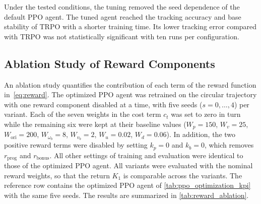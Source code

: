 \documentclass{ieeeaccess}
\begin{document}
Under the tested conditions, the tuning removed the seed dependence of the default PPO agent. The tuned
agent reached the tracking accuracy and base stability of TRPO with a shorter training time. Its lower
tracking error compared with TRPO was not statistically significant with ten runs per configuration.

\subsection{Ablation Study of Reward Components}\label{sec:reward_ablation} An ablation study quantifies
the contribution of each term of the reward function in~\eqref{eq:reward}. The
optimized PPO agent was retrained on the circular trajectory with one reward component disabled at a
time, with five seeds ($s = 0,\dots,4$) per variant. Each of the seven weights in the cost term $c_t$ was
set to zero in turn while the remaining six were kept at their baseline values ($W_p=150$, $W_v=25$,
$W_{\mathrm{ori}}=200$, $W_{\omega_b}=8$, $W_{v_b}=2$, $W_u=0.02$, $W_d=0.06$). In
addition, the two positive reward terms were disabled by setting $k_p = 0$ and $k_b = 0$, which removes
$r_{\mathrm{prog}}$ and $r_{\mathrm{bonus}}$. All other settings of training and evaluation were identical
to those of the optimized PPO agent. All variants were evaluated with the nominal reward weights, so that
the return $K_1$ is comparable across the variants. The reference row contains the optimized PPO agent of
\cref{tab:ppo_optimization_kpi} with the same five seeds. The results are summarized in
\cref{tab:reward_ablation}.
\end{document}

